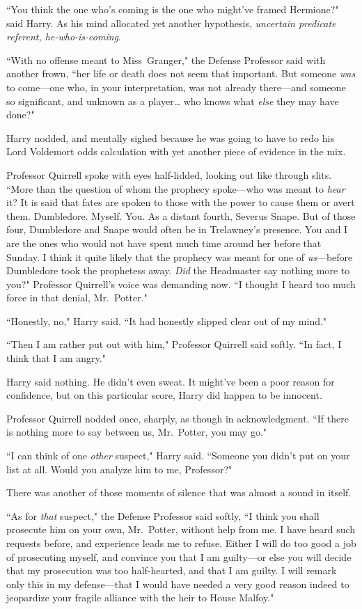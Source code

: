 ``You think the one who's coming is the one who might've framed Hermione?" said Harry. As his mind allocated yet another hypothesis, \emph{uncertain predicate referent, he-who-is-coming}.

``With no offense meant to Miss~Granger," the Defense Professor said with another frown, ``her life or death does not seem that important. But someone \emph{was} to come—one who, in your interpretation, was not already there—and someone so significant, and unknown as a player{\ldots} who knows what \emph{else} they may have done?"

Harry nodded, and mentally sighed because he was going to have to redo his Lord Voldemort odds calculation with yet another piece of evidence in the mix.

Professor Quirrell spoke with eyes half-lidded, looking out like through slits. ``More than the question of whom the prophecy spoke—who was meant to \emph{hear} it? It is said that fates are spoken to those with the power to cause them or avert them. Dumbledore. Myself. You. As a distant fourth, Severus Snape. But of those four, Dumbledore and Snape would often be in Trelawney's presence. You and I are the ones who would not have spent much time around her before that Sunday. I think it quite likely that the prophecy was meant for one of \emph{us}—before Dumbledore took the prophetess away. \emph{Did} the Headmaster say nothing more to you?" Professor Quirrell's voice was demanding now. ``I thought I heard too much force in that denial, Mr.~Potter."

``Honestly, no," Harry said. ``It had honestly slipped clear out of my mind."

``Then I am rather put out with him," Professor Quirrell said softly. ``In fact, I think that I am angry."

Harry said nothing. He didn't even sweat. It might've been a poor reason for confidence, but on this particular score, Harry did happen to be innocent.

Professor Quirrell nodded once, sharply, as though in acknowledgment. ``If there is nothing more to say between us, Mr.~Potter, you may go."

``I can think of one \emph{other} suspect," Harry said. ``Someone you didn't put on your list at all. Would you analyze him to me, Professor?"

There was another of those moments of silence that was almost a sound in itself.

``As for \emph{that} suspect," the Defense Professor said softly, ``I think you shall prosecute him on your own, Mr.~Potter, without help from me. I have heard such requests before, and experience leads me to refuse. Either I will do too good a job of prosecuting myself, and convince you that I am guilty—or else you will decide that my prosecution was too half-hearted, and that I am guilty. I will remark only this in my defense—that I would have needed a very good reason indeed to jeopardize your fragile alliance with the heir to House Malfoy."

